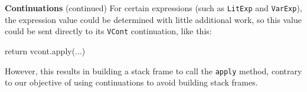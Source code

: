 \begin{minipage}[t]{\sw}
\slidenumber
\LARGE
{\bf Continuations} (continued)\exx
For certain expressions (such as \verb'LitExp' and \verb'VarExp'),
the expression value could be determined with little additional work,
so this value could be sent directly
to its \verb'VCont' continuation, like this:
\Large
\begin{qv}
return vcont.apply(...)
\end{qv}
\LARGE
However, this results in building a stack frame
to call the \verb'apply' method,
contrary to our objective of using continuations
to avoid building stack frames.
\end{minipage}
